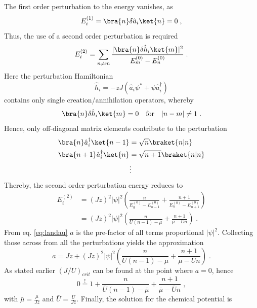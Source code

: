 The first order perturbation to the energy vanishes, as
\begin{equation}
	E_{i}^{(1)} = \bra{n} \delta \hat{a}_i \ket{n} = 0 \; ,
\end{equation}
Thus, the use of a second order perturbation is required
\begin{equation}
	E_{i}^{(2)} = \sum_{n \neq m} \frac{|\bra{n} \delta \hat{h}_i \ket{m}|^2}{E_{m}^{(0)} - E_{n}^{(0)}} \; .
\end{equation}
Here the perturbation Hamiltonian
\begin{equation}
	\hat{h}_i = - z J \left( \hat{a}_i \psi^* + \psi \hat{a}_{i}^{\dag} \right)
\end{equation}
contains only single creation/annihilation operators, whereby
\begin{equation}
	\bra{n} \delta \hat{h}_i \ket{m} = 0 \quad \text{for} \quad |n - m| \neq 1 \; .
\end{equation}
Hence, only off-diagonal matrix elements contribute to the perturbation
\begin{align*}
	\bra{n}  \hat{a}_{i}^{\dag} \ket{n-1} &= \sqrt{n} \braket{n|n} \\
	\bra{n+1}  \hat{a}_{i}^{\dag} \ket{n} &= \sqrt{n+1} \braket{n|n} \\
	& \vdots
\end{align*}
Thereby, the second order perturbation energy reduces to
\begin{align}
	E_{i}^{(2)} &= \left( J z \right)^2 |\psi|^2 \left( \frac{n}{E_{g}^{(0)}- E_{n-1}^{(0)}} +  \frac{n+1}{E_{n}^{(0)}- E_{n+1}^{(0)}} \right) \nonumber \\
	&= \left( J z \right)^2 |\psi|^2 \left( \frac{n}{U(n-1) - \mu} + \frac{n+1}{\mu - U n} \right) \; .
\end{align}
From eq. \eqref{eq:landau} $a$ is the pre-factor of all terms proportional $|\psi|^2$. Collecting those across from all the perturbations yields the approximation 
\begin{equation}
	a = J z + \left( J z \right)^2 |\psi|^2 \left( \frac{n}{U(n-1) - \mu} + \frac{n+1}{\mu - U n} \right) \; .
\end{equation} 
As stated earlier $(J/U)_{crit}$ can be found at the point where $a = 0$, hence
\begin{equation}
	0 \overset{!}{=} 1 + \frac{n}{\bar{U} (n-1) - \bar{\mu}} + \frac{n+1}{\bar{\mu} - \bar{U} n} \; ,
\end{equation}
with $\bar{\mu} = \frac{\mu}{J z}$ and $\bar{U} = \frac{U}{J z}$. Finally, the solution for the chemical potential is \cite{vanoosten}
